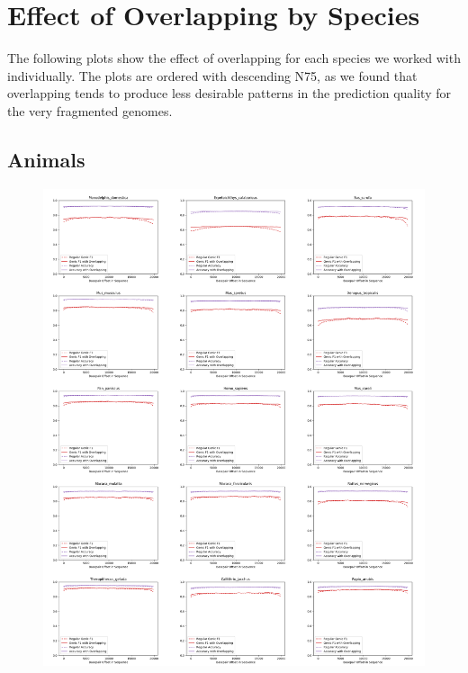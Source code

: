 \documentclass{article}
\begin{document}
\newpage
\section{Effect of Overlapping by Species}
\label{sec:overlapping}

The following plots show the effect of overlapping for each species we worked with individually. The plots are ordered with descending N75, as we found that overlapping tends to produce less desirable patterns in the prediction quality for the very fragmented genomes. 

\subsection{Animals}
\newpage
\def \overlapscale{1.07}
\begin{figure}[!h]
\centerline{\includegraphics[width=\overlapscale\textwidth]{images/overlapping/montage_animals1}}
\end{figure}
\end{document}
